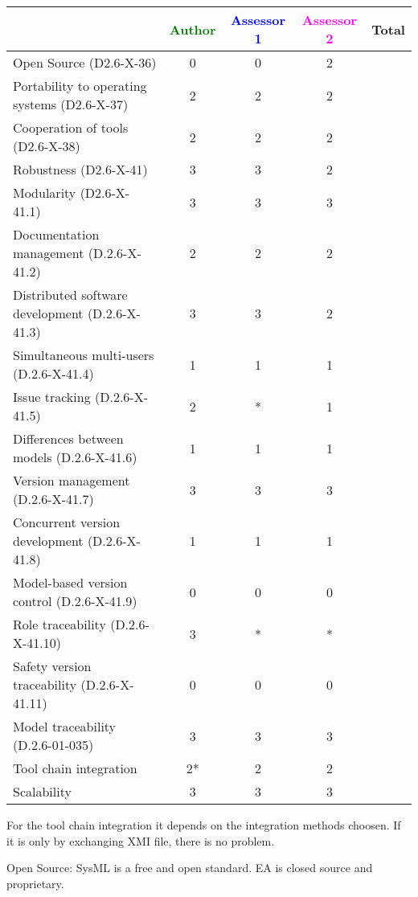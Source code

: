 \begin{tabular}{|l | c | c | c | c|}
\hline
& \textcolor{green}{Author} & \textcolor{blue}{Assessor 1} & \textcolor{magenta}{Assessor 2} & Total \\
\hline 
Open Source (D2.6-X-36) &0 & 0& 2&  \\
\hline 
Portability to operating systems (D2.6-X-37) &2 & 2& 2 &  \\
\hline
Cooperation of tools (D2.6-X-38) &2 & 2&2 &  \\
\hline
Robustness (D2.6-X-41) &3 &3 &2 & \\
\hline
Modularity (D2.6-X-41.1) &3 &3 &3 & \\
\hline
Documentation management (D.2.6-X-41.2) & 2& 2&2 & \\
\hline
Distributed software development (D.2.6-X-41.3)  &3 & 3&2 & \\
\hline
Simultaneous multi-users (D.2.6-X-41.4)   &1 & 1&1 & \\
\hline
Issue tracking (D.2.6-X-41.5) &2 & *& 1& \\
\hline
Differences between models (D.2.6-X-41.6) &1 & 1&1 & \\
\hline
Version management (D.2.6-X-41.7) &3 & 3& 3& \\
\hline
Concurrent version development (D.2.6-X-41.8) &1 & 1& 1& \\
\hline
Model-based version control (D.2.6-X-41.9) &0 & 0& 0& \\
\hline
Role traceability (D.2.6-X-41.10) & 3& *& * & \\
\hline
Safety version traceability (D.2.6-X-41.11) &0 &0 & 0& \\
\hline
Model traceability (D.2.6-01-035) &3 & 3&3 & \\
\hline
Tool chain integration &2* & 2& 2 & \\
\hline
Scalability &3 & 3&3 & \\
\hline
\end{tabular}
\begin{author_comment}
For the tool chain integration it depends on the integration methods
choosen. If it is only by exchanging XMI file, there is no problem.
\end{author_comment}

\begin{assessor2}
Open Source: SysML is a free and open standard. EA is closed source and proprietary.

\end{assessor2}


